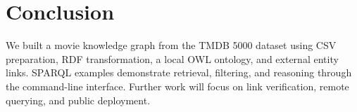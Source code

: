 \section{Conclusion}\label{sec:conclusion}
We built a movie knowledge graph from the TMDB 5000 dataset using CSV preparation, RDF transformation, a local OWL ontology, and external entity links. SPARQL examples demonstrate retrieval, filtering, and reasoning through the command-line interface. Further work will focus on link verification, remote querying, and public deployment.
